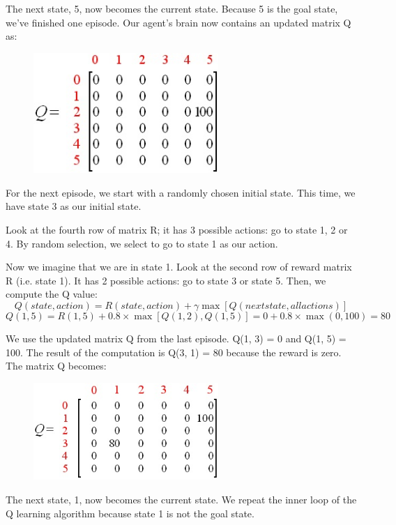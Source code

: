 \documentclass[a4paper, 11pt]{article}
\begin{document}
The next state, 5, now becomes the current state.  Because 5 is the goal state, we've finished one episode.  Our agent's brain now contains an updated matrix Q as:

\begin{figure}[H]
\centering
\includegraphics[width=7cm]{fig/q_matrix2}
\end{figure}

For the next episode, we start with a randomly chosen initial state.  This time, we have state 3 as our initial state.

Look at the fourth row of matrix R; it has 3 possible actions: go to state 1, 2 or 4.  By random selection, we select to go to state 1 as our action.

Now we imagine that we are in state 1.  Look at the second row of reward matrix R (i.e. state 1).  It has 2 possible actions: go to state 3 or state 5.  Then, we compute the Q value:
$$Q(state, action) = R(state, action) + \gamma\max[Q(next state, all actions)]$$
$$Q(1, 5) = R(1, 5) + 0.8\times\max[Q(1, 2), Q(1, 5)] = 0 + 0.8\times\max(0, 100) = 80$$

We use the updated matrix Q from the last episode.  Q(1, 3) = 0 and Q(1, 5) = 100.  The result of the computation is Q(3, 1) = 80 because the reward is zero.  The matrix Q becomes:
\begin{figure}[H]
\centering
\centering\includegraphics[width=7cm]{fig/q_matrix3}
\end{figure}

The next state, 1, now becomes the current state.  We repeat the inner loop of the Q learning algorithm because state 1 is not the goal state.
\end{document}
